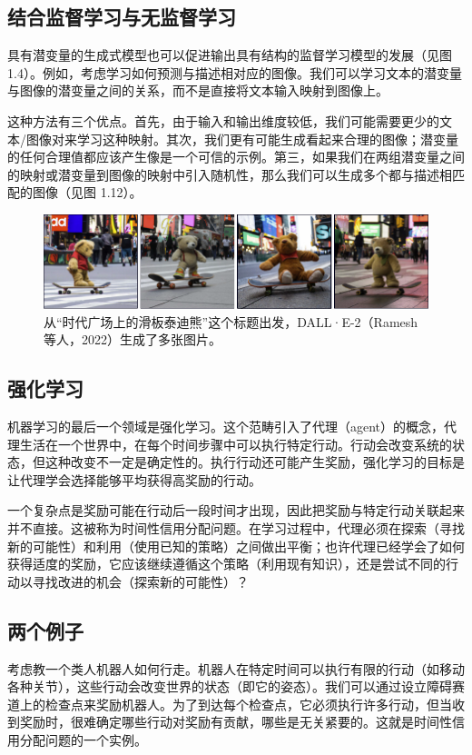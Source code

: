 \documentclass[lang=cn,newtx,10pt,scheme=chinese]{elegantbook}
\begin{document}
\subsection{结合监督学习与无监督学习}
具有潜变量的生成式模型也可以促进输出具有结构的监督学习模型的发展（见图 1.4）。例如，考虑学习如何预测与描述相对应的图像。我们可以学习文本的潜变量与图像的潜变量之间的关系，而不是直接将文本输入映射到图像上。

这种方法有三个优点。首先，由于输入和输出维度较低，我们可能需要更少的文本/图像对来学习这种映射。其次，我们更有可能生成看起来合理的图像；潜变量的任何合理值都应该产生像是一个可信的示例。第三，如果我们在两组潜变量之间的映射或潜变量到图像的映射中引入随机性，那么我们可以生成多个都与描述相匹配的图像（见图 1.12）。

\begin{figure}
	\centering
	\includegraphics[width=0.7\linewidth]{PDFFigures/UDLChap1PDF/IntroVariety.pdf}
	\caption{从“时代广场上的滑板泰迪熊”这个标题出发，DALL·E-2（Ramesh 等人，2022）生成了多张图片。}
\end{figure}


\subsection{强化学习}
机器学习的最后一个领域是强化学习。这个范畴引入了代理（agent）的概念，代理生活在一个世界中，在每个时间步骤中可以执行特定行动。行动会改变系统的状态，但这种改变不一定是确定性的。执行行动还可能产生奖励，强化学习的目标是让代理学会选择能够平均获得高奖励的行动。

一个复杂点是奖励可能在行动后一段时间才出现，因此把奖励与特定行动关联起来并不直接。这被称为时间性信用分配问题。在学习过程中，代理必须在探索（寻找新的可能性）和利用（使用已知的策略）之间做出平衡；也许代理已经学会了如何获得适度的奖励，它应该继续遵循这个策略（利用现有知识），还是尝试不同的行动以寻找改进的机会（探索新的可能性）？
\subsection{两个例子}
考虑教一个类人机器人如何行走。机器人在特定时间可以执行有限的行动（如移动各种关节），这些行动会改变世界的状态（即它的姿态）。我们可以通过设立障碍赛道上的检查点来奖励机器人。为了到达每个检查点，它必须执行许多行动，但当收到奖励时，很难确定哪些行动对奖励有贡献，哪些是无关紧要的。这就是时间性信用分配问题的一个实例。
\end{document}
